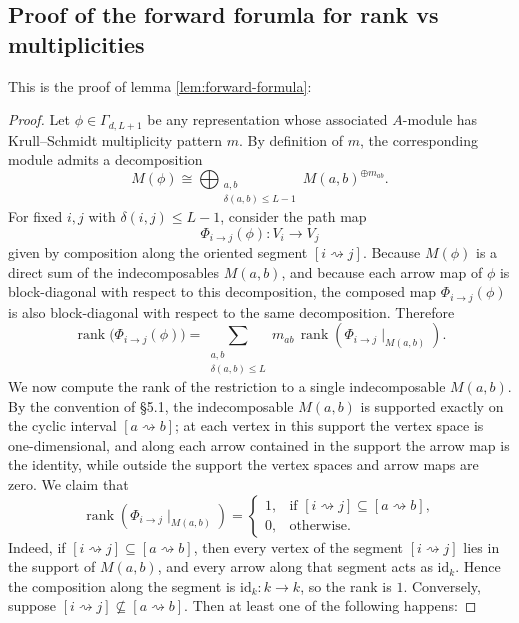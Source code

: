 \documentclass{article}
\theoremstyle{definition}
\begin{document}
\subsection*{Proof of the forward forumla for rank vs multiplicities}
This is the proof of lemma \ref{lem:forward-formula}:
\begin{proof}\label{proof:forward-formula}
Let \(\phi\in\Gamma_{d,L+1}\) be any representation whose associated \(A\)-module has
Krull--Schmidt multiplicity pattern \(m\). By definition of \(m\), the corresponding module admits a
decomposition
\[
M(\phi)\cong \bigoplus_{\substack{a,b\\ \delta(a,b)\le L - 1}} M(a,b)^{\oplus m_{ab}}.
\]
For fixed \(i,j\) with \(\delta(i,j)\le L - 1\), consider the path map
\[
\Phi_{i\to j}(\phi):V_i\to V_j
\]
given by composition along the oriented segment \([i\rightsquigarrow j]\).
\noindent
Because \(M(\phi)\) is a direct sum of the indecomposables \(M(a,b)\), and because each arrow map
of \(\phi\) is block-diagonal with respect to this decomposition, the composed map \(\Phi_{i\to j}(\phi)\)
is also block-diagonal with respect to the same decomposition. Therefore
\[
\operatorname{rank}\bigl(\Phi_{i\to j}(\phi)\bigr)
=
\sum_{\substack{a,b\\ \delta(a,b)\le L}}
m_{ab}\,
\operatorname{rank}\!\left(\Phi_{i\to j}\!\mid_{M(a,b)}\right).
\tag{1}
\]
\noindent
We now compute the rank of the restriction to a single indecomposable \(M(a,b)\).
\noindent
By the convention of §5.1, the indecomposable \(M(a,b)\) is supported exactly on the cyclic interval
\([a\rightsquigarrow b]\); at each vertex in this support the vertex space is one-dimensional, and along
each arrow contained in the support the arrow map is the identity, while outside the support the
vertex spaces and arrow maps are zero.
\noindent
We claim that
\[
\operatorname{rank}\!\left(\Phi_{i\to j}\!\mid_{M(a,b)}\right)
=
\begin{cases}
1,& \text{if } [i\rightsquigarrow j]\subseteq [a\rightsquigarrow b],\\
0,& \text{otherwise.}
\end{cases}
\tag{2}
\]
\noindent
Indeed, if \([i\rightsquigarrow j]\subseteq [a\rightsquigarrow b]\), then every vertex of the segment
\([i\rightsquigarrow j]\) lies in the support of \(M(a,b)\), and every arrow along that segment acts as
\(\mathrm{id}_k\). Hence the composition along the segment is \(\mathrm{id}_k:k\to k\), so the rank is \(1\).
\noindent
Conversely, suppose \([i\rightsquigarrow j]\not\subseteq [a\rightsquigarrow b]\). Then at least one of the
following happens:


\end{proof}
\end{document}
